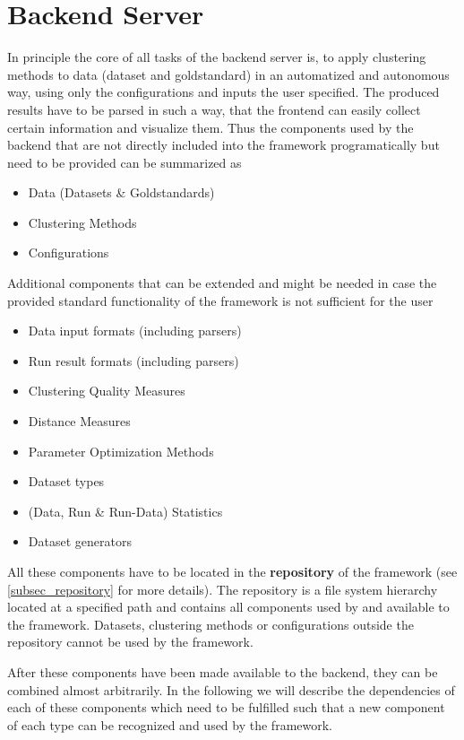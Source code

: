 
	\section{Backend Server}\label{subsec_general_backend}
	 In principle the core of all tasks of the backend server is, to apply clustering methods to data (dataset and goldstandard) in an automatized and autonomous way, using only the configurations and inputs the user specified. The produced results have to be parsed in such a way, that the frontend can easily collect certain information and visualize them. Thus the components used by the backend that are not directly included into the framework programatically but need to be provided can be summarized as
	 \begin{itemize}
	 	\item Data (Datasets \& Goldstandards)
	 	\item Clustering Methods
	 	\item Configurations
	 \end{itemize}
	 
	 Additional components that can be extended and might be needed in case the provided standard functionality of the framework is not sufficient for the user

	\begin{itemize}
		\item Data input formats (including parsers)
		\item Run result formats (including parsers)
		\item Clustering Quality Measures
		\item Distance Measures
		\item Parameter Optimization Methods
		\item Dataset types
		\item (Data, Run \& Run-Data) Statistics
		\item Dataset generators
\end{itemize}		 
	 
	 All these components have to be located in the \textbf{repository} of the framework (see \ref{subsec_repository} for more details). The repository is a file system hierarchy located at a specified path and contains all components used by and available to the framework. Datasets, clustering methods or configurations outside the repository cannot be used by the framework.
	 
	 After these components have been made available to the backend, they can be combined almost arbitrarily. In the following we will describe the dependencies of each of these components which need to be fulfilled such that a new component of each type can be recognized and used by the framework.
	 

